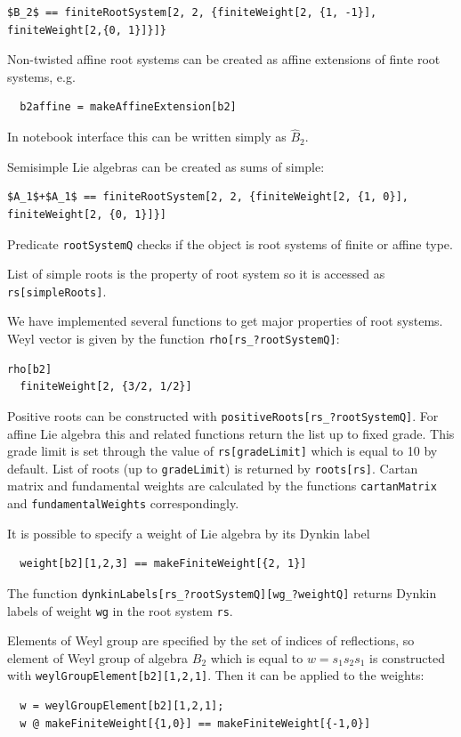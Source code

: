 \documentclass[preprint,12pt]{elsarticle}
\begin{document}
\begin{lstlisting}[mathescape=true]
  $B_2$ == finiteRootSystem[2, 2, {finiteWeight[2, {1, -1}], finiteWeight[2,{0, 1}]}]}
\end{lstlisting}

Non-twisted affine root systems can be created as affine extensions of finte root systems, e.g.
\begin{lstlisting}
  b2affine = makeAffineExtension[b2]
\end{lstlisting}
In notebook interface this can be written simply as $\hat{B}_2$.

Semisimple Lie algebras can be created as sums of simple:
\begin{lstlisting}[mathescape=true]
  $A_1$+$A_1$ == finiteRootSystem[2, 2, {finiteWeight[2, {1, 0}], finiteWeight[2, {0, 1}]}]
\end{lstlisting}

Predicate \lstinline{rootSystemQ} checks if the object is root systems of finite or affine type.

List of simple roots is the property of root system so it is accessed as \lstinline{rs[simpleRoots]}.

We have implemented several functions to get major properties of root systems. Weyl vector is given by the function \lstinline{rho[rs_?rootSystemQ]}:
\begin{lstlisting}[label=list:1]
  rho[b2]
  finiteWeight[2, {3/2, 1/2}]
\end{lstlisting}
Positive roots can be constructed with \lstinline{positiveRoots[rs_?rootSystemQ]}. For affine Lie algebra this and related functions return the list up to fixed grade. This grade limit is set through the value of \lstinline{rs[gradeLimit]} which is equal to 10 by default. List of roots (up to \lstinline{gradeLimit}) is returned by \lstinline{roots[rs]}. Cartan matrix and fundamental weights are calculated by the functions \lstinline{cartanMatrix} and \lstinline{fundamentalWeights} correspondingly.

It is possible to specify a weight of Lie algebra by its Dynkin label
\begin{lstlisting}
  weight[b2][1,2,3] == makeFiniteWeight[{2, 1}]
\end{lstlisting}
The function \lstinline{dynkinLabels[rs_?rootSystemQ][wg_?weightQ]} returns Dynkin labels of weight \lstinline{wg} in the root system \lstinline{rs}.

Elements of Weyl group are specified by the set of indices of reflections, so element of Weyl group of algebra $B_{2}$ which is equal to $w=s_{1}s_{2}s_{1}$ is constructed with \lstinline{weylGroupElement[b2][1,2,1]}. Then it can be applied to the weights:
\begin{lstlisting}
  w = weylGroupElement[b2][1,2,1];
  w @ makeFiniteWeight[{1,0}] == makeFiniteWeight[{-1,0}]
\end{lstlisting}
\end{document}
